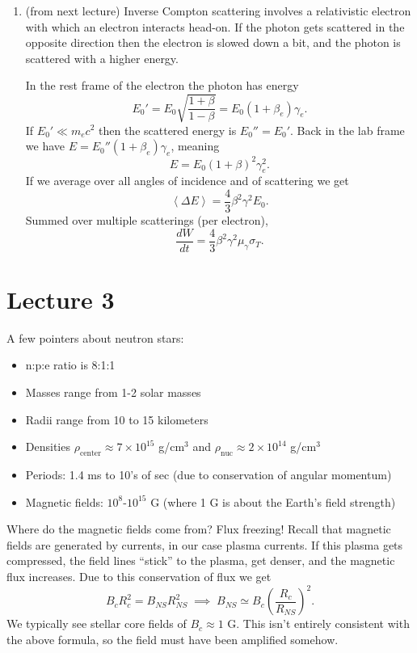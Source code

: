 \documentclass[../a122main.tex]{subfiles}
\begin{document}
\begin{enumerate}[topsep=0pt]
    \item (from next lecture) Inverse Compton scattering involves a relativistic electron with which an electron interacts head-on.
    If the photon gets scattered in the opposite direction then the electron is slowed down a bit, and the photon is scattered with a higher energy.

    In the rest frame of the electron the photon has energy
    \[ E_0' = E_0 \sqrt{\frac{1 + \beta}{1 - \beta}} = E_0 (1 + \beta_e) \gamma_e. \]
    If $E_0' \ll m_e c^2$ then the scattered energy is $E_0'' = E_0'$.
    Back in the lab frame we have $E = E_0'' (1 + \beta_e) \gamma_e$, meaning
    \[ E = E_0 (1 + \beta)^2 \gamma_e^2. \]
    If we average over all angles of incidence and of scattering we get
    \[ \left< \Delta E \right> = \frac{4}{3} \beta^2 \gamma^2 E_0. \]
    Summed over multiple scatterings (per electron),
    \[ \frac{dW}{dt} = \frac{4}{3} \beta^2 \gamma^2 \mu_\gamma \sigma_T. \]
    
    
\end{enumerate}

\section{Lecture 3}
A few pointers about neutron stars:
\begin{itemize}[topsep=0pt]
    \item n:p:e ratio is 8:1:1
    \item Masses range from 1-2 solar masses
    \item Radii range from 10 to 15 kilometers
    \item Densities $\rho_\textrm{center} \approx 7 \times 10^{15}$ g/cm$^3$ and $\rho_\textrm{nuc} \approx 2 \times 10^{14}$ g/cm$^3$
    \item Periods: 1.4 ms to 10's of sec (due to conservation of angular momentum)
    \item Magnetic fields: $10^8$-$10^{15}$ G (where 1 G is about the Earth's field strength)
\end{itemize}

Where do the magnetic fields come from?
Flux freezing!
Recall that magnetic fields are generated by currents, in our case plasma currents.
If this plasma gets compressed, the field lines ``stick'' to the plasma, get denser, and the magnetic flux increases.
Due to this conservation of flux we get
\[ B_c R_c^2 = B_{NS} R_{NS}^2 \;\implies\; B_{NS} \simeq B_c \left( \frac{R_c}{R_{NS}} \right)^2. \]
We typically see stellar core fields of $B_c \approx 1$ G.
This isn't entirely consistent with the above formula, so the field must have been amplified somehow.
\end{document}
